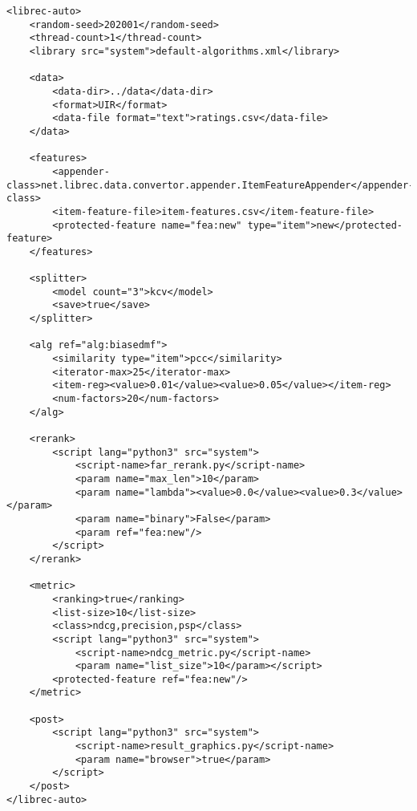 \small{
\begin{verbatim}
<librec-auto>
    <random-seed>202001</random-seed>
    <thread-count>1</thread-count>
    <library src="system">default-algorithms.xml</library>
	
	<data>
        <data-dir>../data</data-dir>
        <format>UIR</format>
        <data-file format="text">ratings.csv</data-file>
	</data>
	
	<features>
		<appender-class>net.librec.data.convertor.appender.ItemFeatureAppender</appender-class>
		<item-feature-file>item-features.csv</item-feature-file>
		<protected-feature name="fea:new" type="item">new</protected-feature>
	</features>
	
	<splitter>
        <model count="3">kcv</model>
        <save>true</save>
	</splitter>
	
	<alg ref="alg:biasedmf">
        <similarity type="item">pcc</similarity>
        <iterator-max>25</iterator-max>
        <item-reg><value>0.01</value><value>0.05</value></item-reg>
        <num-factors>20</num-factors>
	</alg>

	<rerank>
		<script lang="python3" src="system">
			<script-name>far_rerank.py</script-name>
			<param name="max_len">10</param>
			<param name="lambda"><value>0.0</value><value>0.3</value></param>
			<param name="binary">False</param>
			<param ref="fea:new"/>
		</script>
	</rerank>

	<metric>
        <ranking>true</ranking>
        <list-size>10</list-size>
        <class>ndcg,precision,psp</class>
        <script lang="python3" src="system">
            <script-name>ndcg_metric.py</script-name>
            <param name="list_size">10</param></script>
        <protected-feature ref="fea:new"/>
	</metric>

	<post>
        <script lang="python3" src="system">
            <script-name>result_graphics.py</script-name>
            <param name="browser">true</param>
        </script> 
	</post>
</librec-auto>
\end{verbatim}
}

